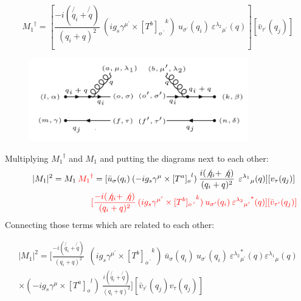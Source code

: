 \begin{equation}
{M_1}^{\dagger} = [\frac{-i(\not{q_i} + \not{q})}{(q_i + q)^2} \:  (ig_s \gamma^{{\mu}^{\prime}}\times {[T^b]_{o\:^{\prime}}}^k) \: u_{{\sigma}^{\prime}}(q_i) \: {\varepsilon^{\lambda_2}}_{{\mu}^{\prime}} (q)][{\bar{v}}_{{\tau}^{\prime}}(q_j)]
\end{equation}
\pagebreak
\begin{figure}[h!]
\centering
\includegraphics[width=0.85\textwidth]{images/QQ/qgqbarMSquer.png}
\end{figure}
Multiplying $ {M_1}^{\dagger} $ and $ {M_1} $ and putting the diagrams next to each other:
\begin{equation}
\begin{split}
|M_1|^2=M_1\:{\color[RGB]{255,0,0} {M_1}^{\dagger}} = [{\bar{u}}_{\sigma}(q_i)\: (-ig_s \gamma^{\mu}\times {[T^a]_o}^l) \: \frac{i(\not{q_i} + \not{q})}{(q_i + q)^2}\:\: {\varepsilon^{\lambda_1}}_{\mu} (q)] [{v}_{\tau}(q_j)]\: \\
\quad\quad\quad\quad\quad\quad\quad\quad\:\:{\color[RGB]{255,0,0}[\frac{-i(\not{q_i} + \not{q})}{(q_i + q)^2} \:  (ig_s \gamma^{{\mu}^{\prime}}\times {[T^b]_{o\:^{\prime}}}^k) \: u_{{\sigma}^{\prime}}(q_i) \: {{\varepsilon^{\lambda_2}}_{{\mu}^{\prime}}}^* (q)][{\bar{v}}_{{\tau}^{\prime}}(q_j)]}
\end{split}
\end{equation}
Connecting those terms which are related to each other:

\begin{equation}
\begin{split}
|M_1|^2=[\frac{-i(\not{q_i} + \not{q})}{(q_i + q)^2} \:
 \:  (ig_s \gamma^{{\mu}^{\prime}}\times {[T^b]_{o\:^{\prime}}}^k) \: {\bar{u}}_{\sigma}(q_i)\:u_{{\sigma}^{\prime}}(q_i) \: {{\varepsilon^{\lambda_2}}_{{\mu}^{\prime}}^* (q) {\varepsilon^{\lambda_1}}_{\mu} (q)} \\
\times (-ig_s \gamma^{\mu}\times {[T^a]_o}^l) \: \frac{i(\not{q_i} + \not{q})}{(q_i + q)^2} ]
[{\bar{v}}_{{\tau}^{\prime}}(q_j) {v}_{\tau}(q_j)]
\end{split}
\end{equation}

